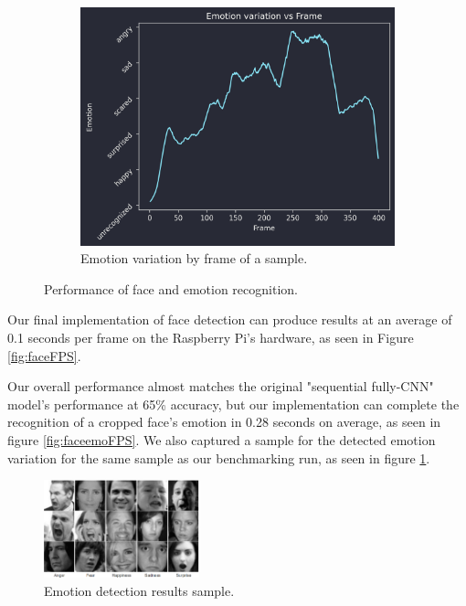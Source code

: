 \begin{figure}[h]
\begin{subfigure}[t]{0.32\textwidth}
        \centering
        \includegraphics[width = \textwidth]{resources/emotionvsframe.png}
        \caption{Emotion variation by frame of a sample.}\label{fig:emotionvsframe}
    \end{subfigure}
    \caption{Performance of face and emotion recognition.}\label{fig:face_emo_bigtable}
\end{figure}



Our final implementation of face detection can produce results at an average of 0.1 seconds per frame on the Raspberry Pi's hardware, as seen in Figure \ref{fig:faceFPS}.


Our overall performance almost matches the original "sequential fully-CNN" model's performance at 65\% accuracy, but our implementation can complete the recognition of a cropped face's emotion in 0.28 seconds on average, as seen in figure \ref{fig:faceemoFPS}. We also captured a sample for the detected emotion variation for the same sample as our benchmarking run, as seen in figure \ref{fig:emotionvsframe}.


\begin{figure}[h]
    \centering
    \includegraphics[width = 0.4\textwidth]{resources/emotion_faces_0.png}
    \caption{Emotion detection results sample.}\label{fig:emotion_faces}
\end{figure}




